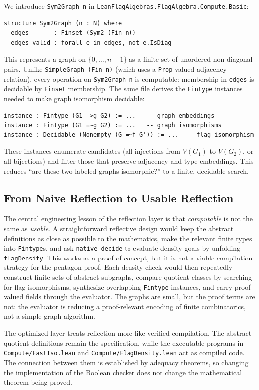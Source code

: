 \documentclass{article}
\newcommand{\lean}[1]{\texttt{#1}}
\begin{document}
We introduce \lean{Sym2Graph n} in
\lean{LeanFlagAlgebras.FlagAlgebra.Compute.Basic}:
\begin{lstlisting}
structure Sym2Graph (n : N) where
  edges       : Finset (Sym2 (Fin n))
  edges_valid : forall e in edges, not e.IsDiag
\end{lstlisting}
This represents a graph on $\{0,\ldots,n-1\}$ as a finite set of unordered
non-diagonal pairs.  Unlike \lean{SimpleGraph (Fin n)} (which uses a
\lean{Prop}-valued adjacency relation), every operation on \lean{Sym2Graph n}
is computable: membership in \lean{edges} is decidable by \lean{Finset}
membership.  The same file derives the \lean{Fintype} instances needed to
make graph isomorphism decidable:
\begin{lstlisting}
instance : Fintype (G1 ->g G2) := ...   -- graph embeddings
instance : Fintype (G1 =~g G2) := ...   -- graph isomorphisms
instance : Decidable (Nonempty (G =~f G')) := ...  -- flag isomorphism
\end{lstlisting}
These instances enumerate candidates (all injections from $V(G_1)$ to
$V(G_2)$, or all bijections) and filter those that preserve adjacency and
type embeddings.  This reduces ``are these two labeled graphs isomorphic?'' to
a finite, decidable search.

\subsection{From Naive Reflection to Usable Reflection}

The central engineering lesson of the reflection layer is that
\emph{computable} is not the same as \emph{usable}.  A straightforward
reflective design would keep the abstract definitions as close as possible to
the mathematics, make the relevant finite types into \lean{Fintype}s, and ask
\lean{native\_decide} to evaluate density goals by unfolding
\lean{flagDensity}.  This works as a proof of concept, but it is not a viable
compilation strategy for the pentagon proof.  Each density check would then
repeatedly construct finite sets of abstract subgraphs, compare quotient
classes by searching for flag isomorphisms, synthesize overlapping
\lean{Fintype} instances, and carry proof-valued fields through the
evaluator.  The graphs are small, but the proof terms are not: the evaluator
is reducing a proof-relevant encoding of finite combinatorics, not a simple
graph algorithm.

The optimized layer treats reflection more like verified compilation.  The
abstract quotient definitions remain the specification, while the executable
programs in \lean{Compute/FastIso.lean} and \lean{Compute/FlagDensity.lean}
act as compiled code.  The connection between them is established by adequacy
theorems, so changing the implementation of the Boolean checker does not
change the mathematical theorem being proved.
\end{document}
